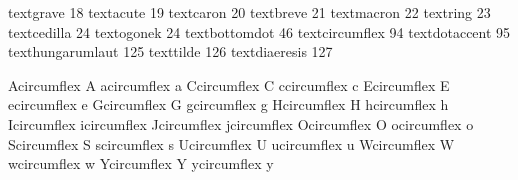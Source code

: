 

\startencoding[default]

 textgrave         18 
 textacute         19
 textcaron         20 
 textbreve         21
 textmacron        22
 textring          23
 textcedilla       24 
 textogonek        24 %
 textbottomdot     46  
 textcircumflex    94 
 textdotaccent     95
 texthungarumlaut 125
 texttilde        126 
 textdiaeresis    127

 Acircumflex {\buildtextaccent\textcircumflex A}
 acircumflex {\buildtextaccent\textcircumflex a}
 Ccircumflex {\buildtextaccent\textcircumflex C}
 ccircumflex {\buildtextaccent\textcircumflex c}
 Ecircumflex {\buildtextaccent\textcircumflex E}
 ecircumflex {\buildtextaccent\textcircumflex e}
 Gcircumflex {\buildtextaccent\textcircumflex G}
 gcircumflex {\buildtextaccent\textcircumflex g}
 Hcircumflex {\buildtextaccent\textcircumflex H}
 hcircumflex {\buildtextaccent\textcircumflex h}
 Icircumflex {\buildtextaccent\textcircumflex \dotlessI}
 icircumflex {\buildtextaccent\textcircumflex \dotlessi}
 Jcircumflex {\buildtextaccent\textcircumflex \dotlessJ}
 jcircumflex {\buildtextaccent\textcircumflex \dotlessj}
 Ocircumflex {\buildtextaccent\textcircumflex O}
 ocircumflex {\buildtextaccent\textcircumflex o}
 Scircumflex {\buildtextaccent\textcircumflex S}
 scircumflex {\buildtextaccent\textcircumflex s}
 Ucircumflex {\buildtextaccent\textcircumflex U}
 ucircumflex {\buildtextaccent\textcircumflex u}
 Wcircumflex {\buildtextaccent\textcircumflex W}
 wcircumflex {\buildtextaccent\textcircumflex w}
 Ycircumflex {\buildtextaccent\textcircumflex Y}
 ycircumflex {\buildtextaccent\textcircumflex y}

